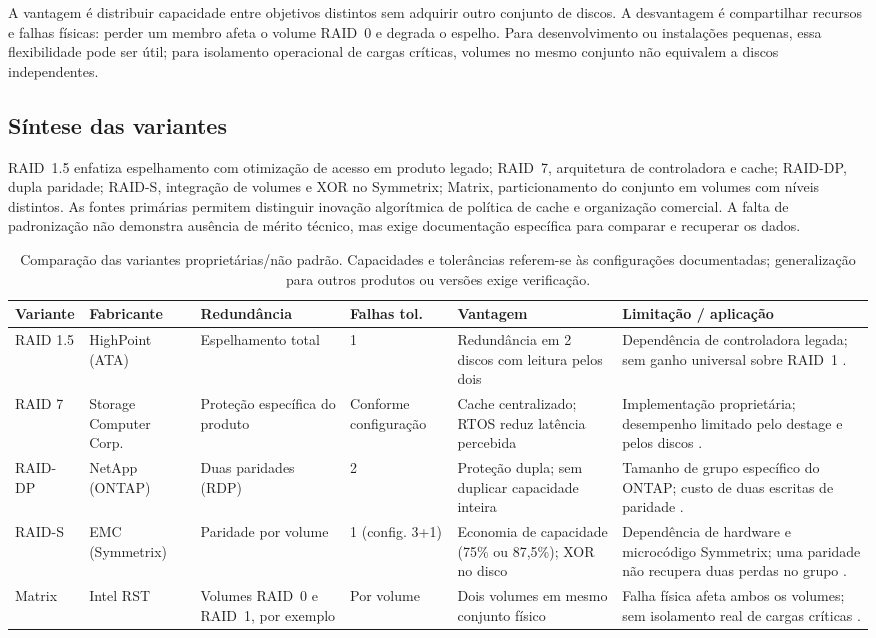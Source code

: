 \documentclass[titlepage]{article}
\begin{document}
A vantagem é distribuir capacidade entre objetivos distintos sem adquirir outro conjunto de discos. A desvantagem é compartilhar recursos e falhas físicas: perder um membro afeta o volume RAID~0 e degrada o espelho. Para desenvolvimento ou instalações pequenas, essa flexibilidade pode ser útil; para isolamento operacional de cargas críticas, volumes no mesmo conjunto não equivalem a discos independentes.

\subsection{Síntese das variantes}
RAID~1.5 enfatiza espelhamento com otimização de acesso em produto legado; RAID~7, arquitetura de controladora e cache; RAID-DP, dupla paridade; RAID-S, integração de volumes e XOR no Symmetrix; Matrix, particionamento do conjunto em volumes com níveis distintos. As fontes primárias permitem distinguir inovação algorítmica de política de cache e organização comercial. A falta de padronização não demonstra ausência de mérito técnico, mas exige documentação específica para comparar e recuperar os dados.

\begin{table}[htbp]
\centering\footnotesize
\begin{tabularx}{\textwidth}{p{}p{}p{}p{}XX}
\toprule
Variante & Fabricante & Redundância & Falhas tol. & Vantagem & Limitação / aplicação \\
\midrule
RAID 1.5 & HighPoint (ATA) & Espelhamento total & 1 & Redundância em 2 discos com leitura pelos dois & Dependência de controladora legada; sem ganho universal sobre RAID~1 \cite{highpoint_15}. \\
RAID 7 & Storage Computer Corp. & Proteção específica do produto & Conforme configuração & Cache centralizado; RTOS reduz latência percebida & Implementação proprietária; desempenho limitado pelo destage e pelos discos \cite{storagecomputer_7}. \\
RAID-DP & NetApp (ONTAP) & Duas paridades (RDP) & 2 & Proteção dupla; sem duplicar capacidade inteira & Tamanho de grupo específico do ONTAP; custo de duas escritas de paridade \cite{corbett2004,netapp_raid_dp}. \\
RAID-S & EMC (Symmetrix) & Paridade por volume & 1 (config. 3+1) & Economia de capacidade (75\% ou 87,5\%); XOR no disco & Dependência de hardware e microcódigo Symmetrix; uma paridade não recupera duas perdas no grupo \cite{raid_s_nasa}. \\
Matrix & Intel RST & Volumes RAID~0 e RAID~1, por exemplo & Por volume & Dois volumes em mesmo conjunto físico & Falha física afeta ambos os volumes; sem isolamento real de cargas críticas \cite{intel_matrix}. \\
\bottomrule
\end{tabularx}
\caption{Comparação das variantes proprietárias/não padrão. Capacidades e tolerâncias referem-se às configurações documentadas; generalização para outros produtos ou versões exige verificação.}
\label{tab:raid_nao_padrao}
\end{table}
\end{document}
